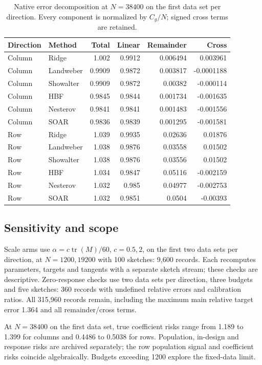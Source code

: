 \documentclass[11pt,a4paper,leqno]{article}
\numberwithin{equation}{section}
\numberwithin{figure}{section}
\numberwithin{table}{section}
\theoremstyle{plain}
\theoremstyle{definition}
\theoremstyle{remark}
\begin{document}
\begin{table}[!htbp]\centering\small
\caption{Native error decomposition at $N=38400$ on the first data set per direction. Every component is normalized by $C_g/N$; signed cross terms are retained.}
\label{tab:v7_decomposition}
\begin{tabular}{llrrrr}\toprule
Direction & Method & Total & Linear & Remainder & Cross \\\midrule
Column & Ridge & 1.002 & 0.9912 & 0.006494 & 0.003961 \\
Column & Landweber & 0.9909 & 0.9872 & 0.003817 & -0.0001188 \\
Column & Showalter & 0.9909 & 0.9872 & 0.00382 & -0.000114 \\
Column & HBF & 0.9845 & 0.9844 & 0.001734 & -0.001635 \\
Column & Nesterov & 0.9841 & 0.9841 & 0.001483 & -0.001556 \\
Column & SOAR & 0.9836 & 0.9839 & 0.001295 & -0.001581 \\
Row & Ridge & 1.039 & 0.9935 & 0.02636 & 0.01876 \\
Row & Landweber & 1.038 & 0.9876 & 0.03558 & 0.01502 \\
Row & Showalter & 1.038 & 0.9876 & 0.03556 & 0.01502 \\
Row & HBF & 1.034 & 0.9847 & 0.05116 & -0.002159 \\
Row & Nesterov & 1.032 & 0.985 & 0.04977 & -0.002753 \\
Row & SOAR & 1.032 & 0.9851 & 0.0504 & -0.00393 \\
\bottomrule\end{tabular}
\end{table}


\subsection{Sensitivity and scope}
Scale arms use $\alpha=c\operatorname{tr}(M)/60$, $c=0.5,2$, on the
first two data sets per direction, at $N=1200,19200$ with 100 sketches:
9,600 records. Each recomputes parameters, targets and tangents with a
separate sketch stream; these checks are descriptive. Zero-response
checks use two data sets per direction, three budgets and five sketches:
360 records with undefined relative errors and calibration ratios.
All 315,960 records remain, including the maximum main relative target
error 1.364 and all remainder/cross terms.

At $N=38400$ on the first data set, true coefficient risks range from
1.189 to 1.399 for columns and 0.4486 to 0.5038 for rows. Population,
in-design and response risks are archived separately; the row population
signal and coefficient risks coincide algebraically. Budgets exceeding
1200 explore the fixed-data limit.
\end{document}
